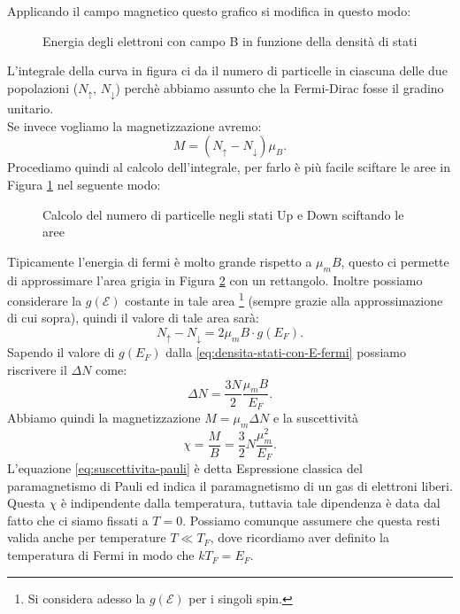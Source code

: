 Applicando il campo magnetico questo grafico si modifica in questo modo:
\begin{figure}[H]
    \centering
    \caption{\scriptsize Energia degli elettroni con campo B in funzione della densità di stati}
    \label{fig:energia-degli-elettroni-con-campo-b-in-funzione-della-densita-di-stati}
\end{figure}
\noindent
L'integrale della curva in figura ci da il numero di particelle in ciascuna delle due popolazioni ($N_{\uparrow}$, $N_{\downarrow}$) perchè abbiamo assunto che la Fermi-Dirac fosse il gradino unitario.\\
Se invece vogliamo la magnetizzazione avremo:
\[
	M = \left( N_{\uparrow}-N_{\downarrow} \right)\mu_{B}
.\] 
Procediamo quindi al calcolo dell'integrale, per farlo è più facile sciftare le aree in Figura \ref{fig:energia-degli-elettroni-con-campo-b-in-funzione-della-densita-di-stati} nel seguente modo:
\begin{figure}[H]
    \centering
    \caption{\scriptsize Calcolo del numero di particelle negli stati Up e Down sciftando le aree}
    \label{fig:calcolo-del-numero-di-particelle-negli-stati-up-e-down-sciftando-le-aree}
\end{figure}
\noindent
Tipicamente l'energia di fermi è molto grande rispetto a $\mu_{m}B$, questo ci permette di approssimare l'area grigia in Figura \ref{fig:calcolo-del-numero-di-particelle-negli-stati-up-e-down-sciftando-le-aree} con un rettangolo. Inoltre possiamo considerare la $g( \mathcal{E} ) $ costante in tale area \footnote{Si considera adesso la $g( \mathcal{E} ) $ per i singoli spin.} (sempre grazie alla approssimazione di cui sopra), quindi il valore di tale area sarà:
\[
	N_{\uparrow}- N_{\downarrow} = 2\mu _{m}B \cdot g( E_{F}) 
.\] 
Sapendo il valore di $g( E_{F})$ dalla \ref{eq:densita-stati-con-E-fermi} possiamo riscrivere il $\Delta N$ come:
\[
	\Delta N = \frac{3N}{2}\frac{\mu _{m}B}{E_{F}}
.\] 
Abbiamo quindi la magnetizzazione $M = \mu_{m}\Delta N$ e la suscettività 
\[
	\chi = \frac{M}{B} = \frac{3}{2}N \frac{\mu_{m}^2}{E_{F}} \label{eq:suscettivita-pauli}
.\] 
L'equazione \ref{eq:suscettivita-pauli} è detta Espressione classica del paramagnetismo di Pauli ed indica il paramagnetismo di un gas di elettroni liberi.\\
Questa $\chi$ è indipendente dalla temperatura, tuttavia tale dipendenza è data dal fatto che ci siamo fissati a $T=0$. Possiamo comunque assumere che questa resti valida anche per temperature $T\ll T_{F}$, dove ricordiamo aver definito la temperatura di Fermi in modo che  $kT_{F}=E_{F}$.\\
